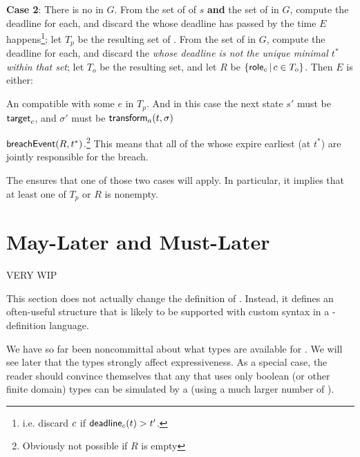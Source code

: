\documentclass[12pt]{article}
\begin{document}
{\bf Case 2}: There is no \enabled \mustnarule in $G$. From the set of \enabled \maynarules of $s$ {\bf and} the set of \enabled \rmustnarules in $G$, compute the deadline for each, and discard the \actionrules whose deadline has passed by the time $E$ happens\footnote{i.e. discard $c$ if $\textsf{deadline}_{c}(t) > t'$.};  let $T_p$ be the resulting set of \actionrules. From the set of \enabled \rmustnarules in $G$, compute the deadline for each, and discard the {\actionrules} {\it whose deadline is not the unique minimal \TimeStamp $t^*$ within that set}; let $T_o$ be the resulting set, and let $R$ be $\{ \textsf{role}_{c} \, \vert \, c \in T_{o} \}$. Then $E$ is either:
\begin{PPI}
	\item An \Event compatible with some \actionrule $e$ in $T_p$. And in this case the next state $s'$ must be $\textsf{target}_{c}$, and $\sigma'$ must be $\textsf{transform}_{a}(t,\sigma)$
	\item $\textsf{breachEvent}(R,t^*)$.\footnote{Obviously not possible if $R$ is empty} This means that all of the \Roles whose \enabled \rmustnarule expire earliest (at $t^*$) are jointly responsible for the breach.
\end{PPI}
The \bostgc ensures that one of those two cases will apply. In particular, it implies that at least one of $T_p$ or $R$ is nonempty.







\section{May-Later and Must-Later}  \label{slater}
VERY WIP

This section does not actually change the definition of \Contract. Instead, it defines an often-useful \Contract structure that is likely to be supported with custom syntax in a \Contract-definition language.

We have so far been noncommittal about what types are available for \GVars.%
We will see later that the types strongly affect expressiveness. As a special case, the reader should convince themselves that any \Contract that uses only boolean (or other finite domain) types can be simulated by a \FSContract (using a much larger number of \States).
\end{document}
